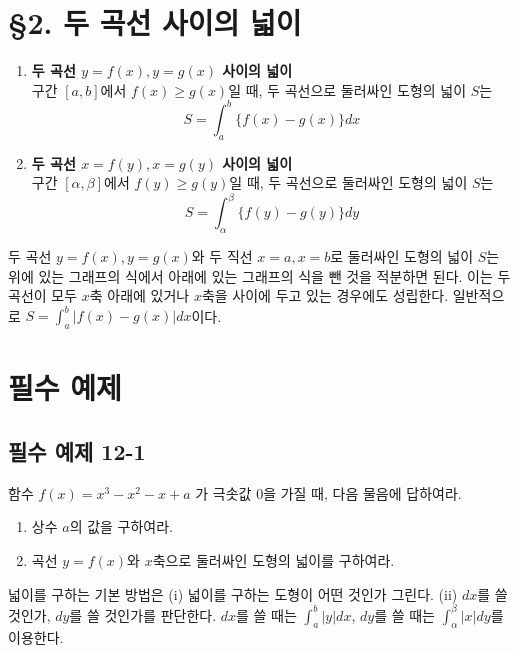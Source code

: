 \documentclass[a4paper,11pt]{article}
\begin{document}
\section*{§2. 두 곡선 사이의 넓이}

\begin{conceptbox}[기본 정석]
\begin{enumerate}
    \item \textbf{두 곡선 $y=f(x), y=g(x)$ 사이의 넓이}\\
    구간 $[a, b]$에서 $f(x) \ge g(x)$일 때, 두 곡선으로 둘러싸인 도형의 넓이 $S$는
    \[ S = \int_{a}^{b} \{f(x) - g(x)\} dx \]
    \item \textbf{두 곡선 $x=f(y), x=g(y)$ 사이의 넓이}\\
    구간 $[\alpha, \beta]$에서 $f(y) \ge g(y)$일 때, 두 곡선으로 둘러싸인 도형의 넓이 $S$는
    \[ S = \int_{\alpha}^{\beta} \{f(y) - g(y)\} dy \]
\end{enumerate}
\end{conceptbox}

\begin{advicebox}
두 곡선 $y=f(x), y=g(x)$와 두 직선 $x=a, x=b$로 둘러싸인 도형의 넓이 $S$는 위에 있는 그래프의 식에서 아래에 있는 그래프의 식을 뺀 것을 적분하면 된다. 이는 두 곡선이 모두 $x$축 아래에 있거나 $x$축을 사이에 두고 있는 경우에도 성립한다. 일반적으로 $S = \int_{a}^{b} |f(x) - g(x)| dx$이다.
\end{advicebox}

\newpage

\section*{필수 예제}

\subsection*{필수 예제 12-1}
함수 $f(x)=x^{3}-x^{2}-x+a$ 가 극솟값 0을 가질 때, 다음 물음에 답하여라.
\begin{enumerate}[label=(\arabic*)]
    \item 상수 $a$의 값을 구하여라.
    \item 곡선 $y=f(x)$와 $x$축으로 둘러싸인 도형의 넓이를 구하여라.
\end{enumerate}

\begin{studybox}
넓이를 구하는 기본 방법은 (i) 넓이를 구하는 도형이 어떤 것인가 그린다. (ii) $dx$를 쓸 것인가, $dy$를 쓸 것인가를 판단한다. $dx$를 쓸 때는 $\int_{a}^{b} |y| dx$, $dy$를 쓸 때는 $\int_{\alpha}^{\beta} |x| dy$를 이용한다.
\end{studybox}
\end{document}
